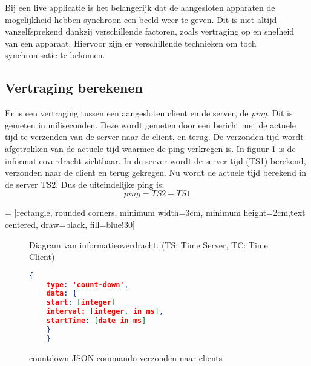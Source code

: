 Bij een live applicatie is het belangerijk dat de aangesloten apparaten de mogelijkheid hebben synchroon een beeld weer te geven. Dit is niet altijd vanzelfsprekend dankzij verschillende factoren, zoals vertraging op en snelheid van een apparaat. Hiervoor zijn er verschillende technieken om toch synchronisatie te bekomen.

\subsection{Vertraging berekenen}
Er is een vertraging tussen een aangesloten client en de server, de {\it ping}. Dit is gemeten in miliseconden.
Deze wordt gemeten door een bericht met de actuele tijd te verzenden van de server naar de client, en terug. De verzonden tijd wordt afgetrokken van de actuele tijd waarmee de ping verkregen is.
In figuur \ref{diag} is de informatieoverdracht zichtbaar. In de server wordt de server tijd (TS1) berekend, verzonden naar de client en terug gekregen.
Nu wordt de actuele tijd berekend in de server TS2. Dus de uiteindelijke ping is:
\[ping = TS2 - TS1\]

 = [rectangle, rounded corners, minimum width=3cm, minimum height=2cm,text centered, draw=black, fill=blue!30]


\begin{figure}
    \caption{Diagram van informatieoverdracht. (TS: Time Server, TC: Time Client)} \label{diag}
\end{figure}

\begin{figure}
    \begin{lstlisting}[language=json,firstnumber=1]
    {
    type: 'count-down',
    data: {
    start: [integer]
    interval: [integer, in ms],
    startTime: [date in ms]
    }
    }
    \end{lstlisting}
    \caption{countdown JSON commando verzonden naar clients} \label{json2}
\end{figure}

